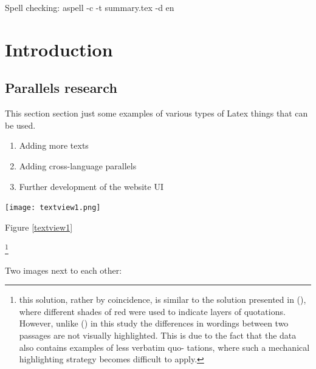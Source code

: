 Spell checking: aspell -c -t summary.tex -d en



\section{Introduction}
\subsection{Parallels research}

This section section just some examples of various types of Latex things that can be used.

\begin{enumerate}
 \item Adding more texts
 \item Adding cross-language parallels
 \item Further development of the website UI
\end{enumerate}

\newpage


\texttt{[image: textview1.png]}
\label{textview1}

\medskip
Figure \ref{textview1}

\footnote{this solution, rather by coincidence, is similar to the solution presented in (\cite{sturgeon2017}), where different shades of red were used to indicate layers of quotations. However, unlike (\cite{sturgeon2017}) in this study the differences in wordings between two passages are not visually highlighted. This is due to the fact that the data also contains examples of less verbatim quo-
tations, where such a mechanical highlighting strategy becomes difficult to apply.}


Two images next to each other:
\begin{figure}[!tbp]
  \centering
  \hfill
\end{figure}



